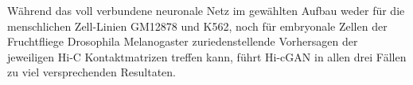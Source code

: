Während das voll verbundene neuronale Netz im gewählten Aufbau weder für die menschlichen Zell-Linien GM12878 und K562, 
noch für embryonale Zellen der Fruchtfliege Drosophila Melanogaster zuriedenstellende Vorhersagen der jeweiligen Hi-C Kontaktmatrizen treffen kann, 
führt Hi-cGAN in allen drei Fällen zu viel versprechenden Resultaten.
